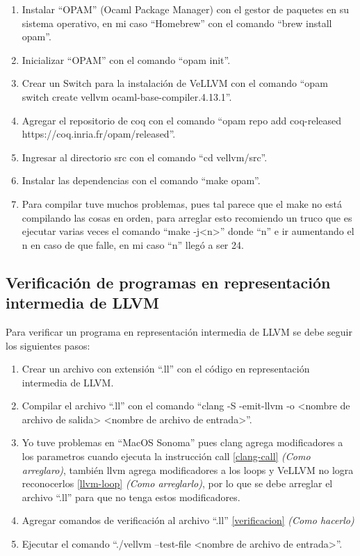 \documentclass{hw-template}
\begin{document}
\begin{enumerate}
    \item Instalar ``OPAM'' \cite{opam} (Ocaml Package Manager) con el gestor
    de paquetes en su sistema operativo, en mi caso ``Homebrew'' \cite{homebrew}
    con el comando ``brew install opam''.
    \item Inicializar ``OPAM'' con el comando ``opam init''.
    \item Crear un Switch para la instalación de VeLLVM con el comando 
    ``opam switch create vellvm ocaml-base-compiler.4.13.1''.
    \item Agregar el repositorio de coq con el comando ``opam repo
    add coq-released https://coq.inria.fr/opam/released''.
    \item Ingresar al directorio src con el comando ``cd vellvm/src''.
    \item Instalar las dependencias con el comando ``make opam''.
    \item Para compilar tuve muchos problemas, pues tal parece que el make no está
    compilando las cosas en orden, para arreglar esto recomiendo un truco que es
    ejecutar varias veces el comando ``make -j<n>'' donde ``n'' e ir aumentando
    el n en caso de que falle, en mi caso ``n'' llegó a ser 24.
\end{enumerate}

\subsection{Verificación de programas en representación intermedia de LLVM}
Para verificar un programa en representación intermedia de LLVM se debe seguir los siguientes pasos:
\begin{enumerate}
    \item Crear un archivo con extensión ``.ll'' con el código en representación
    intermedia de LLVM.
    \item Compilar el archivo ``.ll'' con el comando ``clang -S -emit-llvm -o
    <nombre de archivo de salida> <nombre de archivo de entrada>''.
    \item Yo tuve problemas en ``MacOS Sonoma'' pues clang agrega modificadores
    a los parametros cuando ejecuta la instrucción call
    \ref{clang-call}{\color{blue} \textit{(Como arreglaro)}}, también llvm agrega
    modificadores a los loops y VeLLVM no logra reconocerlos
    \ref{llvm-loop}{\color{blue} \textit{(Como arreglarlo)}}, por lo que se debe
    arreglar el archivo ``.ll'' para que no tenga estos modificadores.
    \item Agregar comandos de verificación al archivo ``.ll''
    \ref{verificacion}{\color{blue} \textit{(Como hacerlo)}}
    \item Ejecutar el comando ``./vellvm --test-file <nombre de archivo de entrada>''.
\end{enumerate}
\end{document}
